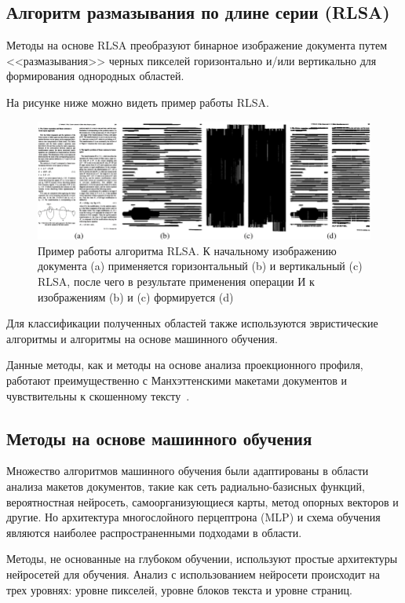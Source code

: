 \subsection{Алгоритм размазывания по длине серии (RLSA)}

Методы на основе RLSA преобразуют бинарное изображение документа путем <<размазывания>> черных пикселей горизонтально и/или вертикально для формирования однородных областей.

На рисунке ниже можно видеть пример работы RLSA.

\begin{figure}[H]
	\centering
	\includegraphics[width=\textwidth]{img/rlsa.png}
    \caption{Пример работы алгоритма RLSA. К начальному изображению документа (a) применяется горизонтальный (b) и вертикальный (c) RLSA, после чего в результате применения операции И к изображениям (b) и (c) формируется (d)}
	\label{fig:}
\end{figure}

Для классификации полученных областей также используются эвристические алгоритмы и алгоритмы на основе машинного обучения.

Данные методы, как и методы на основе анализа проекционного профиля, работают преимущественно с Манхэттенскими макетами документов и чувствительны к скошенному тексту~\cite{dla-book}.

\subsection{Методы на основе машинного обучения}

Множество алгоритмов машинного обучения были адаптированы в области анализа макетов документов, такие как сеть радиально-базисных функций, вероятностная нейросеть, самоорганизующиеся карты, метод опорных векторов и другие.
Но архитектура многослойного перцептрона (MLP) и схема обучения являются наиболее распространенными подходами в области.

Методы, не основанные на глубоком обучении, используют простые архитектуры нейросетей для обучения.
Анализ с использованием нейросети происходит на трех уровнях: уровне пикселей, уровне блоков текста и уровне страниц.

